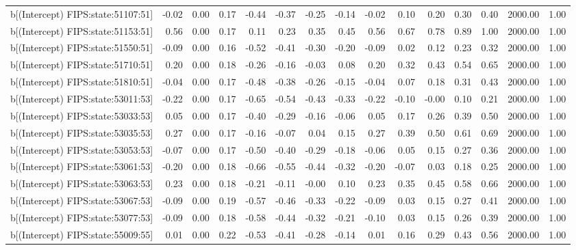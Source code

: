 \begin{table}[ht]
\begin{tabular}{rrrrrrrrrrrrrrr}
  b[(Intercept) FIPS:state:51107:51] & -0.02 & 0.00 & 0.17 & -0.44 & -0.37 & -0.25 & -0.14 & -0.02 & 0.10 & 0.20 & 0.30 & 0.40 & 2000.00 & 1.00 \\ 
  b[(Intercept) FIPS:state:51153:51] & 0.56 & 0.00 & 0.17 & 0.11 & 0.23 & 0.35 & 0.45 & 0.56 & 0.67 & 0.78 & 0.89 & 1.00 & 2000.00 & 1.00 \\ 
  b[(Intercept) FIPS:state:51550:51] & -0.09 & 0.00 & 0.16 & -0.52 & -0.41 & -0.30 & -0.20 & -0.09 & 0.02 & 0.12 & 0.23 & 0.32 & 2000.00 & 1.00 \\ 
  b[(Intercept) FIPS:state:51710:51] & 0.20 & 0.00 & 0.18 & -0.26 & -0.16 & -0.03 & 0.08 & 0.20 & 0.32 & 0.43 & 0.54 & 0.65 & 2000.00 & 1.00 \\ 
  b[(Intercept) FIPS:state:51810:51] & -0.04 & 0.00 & 0.17 & -0.48 & -0.38 & -0.26 & -0.15 & -0.04 & 0.07 & 0.18 & 0.31 & 0.43 & 2000.00 & 1.00 \\ 
  b[(Intercept) FIPS:state:53011:53] & -0.22 & 0.00 & 0.17 & -0.65 & -0.54 & -0.43 & -0.33 & -0.22 & -0.10 & -0.00 & 0.10 & 0.21 & 2000.00 & 1.00 \\ 
  b[(Intercept) FIPS:state:53033:53] & 0.05 & 0.00 & 0.17 & -0.40 & -0.29 & -0.16 & -0.06 & 0.05 & 0.17 & 0.26 & 0.39 & 0.50 & 2000.00 & 1.00 \\ 
  b[(Intercept) FIPS:state:53035:53] & 0.27 & 0.00 & 0.17 & -0.16 & -0.07 & 0.04 & 0.15 & 0.27 & 0.39 & 0.50 & 0.61 & 0.69 & 2000.00 & 1.00 \\ 
  b[(Intercept) FIPS:state:53053:53] & -0.07 & 0.00 & 0.17 & -0.50 & -0.40 & -0.29 & -0.18 & -0.06 & 0.05 & 0.15 & 0.27 & 0.36 & 2000.00 & 1.00 \\ 
  b[(Intercept) FIPS:state:53061:53] & -0.20 & 0.00 & 0.18 & -0.66 & -0.55 & -0.44 & -0.32 & -0.20 & -0.07 & 0.03 & 0.18 & 0.25 & 2000.00 & 1.00 \\ 
  b[(Intercept) FIPS:state:53063:53] & 0.23 & 0.00 & 0.18 & -0.21 & -0.11 & -0.00 & 0.10 & 0.23 & 0.35 & 0.45 & 0.58 & 0.66 & 2000.00 & 1.00 \\ 
  b[(Intercept) FIPS:state:53067:53] & -0.09 & 0.00 & 0.19 & -0.57 & -0.46 & -0.33 & -0.22 & -0.09 & 0.03 & 0.15 & 0.27 & 0.41 & 2000.00 & 1.00 \\ 
  b[(Intercept) FIPS:state:53077:53] & -0.09 & 0.00 & 0.18 & -0.58 & -0.44 & -0.32 & -0.21 & -0.10 & 0.03 & 0.15 & 0.26 & 0.39 & 2000.00 & 1.00 \\ 
  b[(Intercept) FIPS:state:55009:55] & 0.01 & 0.00 & 0.22 & -0.53 & -0.41 & -0.28 & -0.14 & 0.01 & 0.16 & 0.29 & 0.43 & 0.56 & 2000.00 & 1.00 \\ 

\end{tabular}
\end{table}
